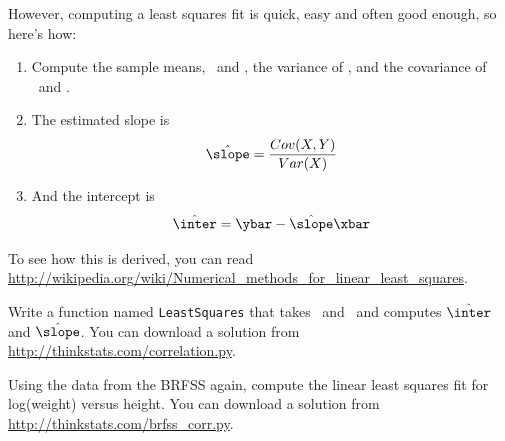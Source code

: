 \documentclass[12pt]{book}
\begin{document}
However, computing a least squares fit is quick, easy and often good
enough, so here's how:

\begin{enumerate}

\item Compute the sample means, \myxbar~and \myybar, the variance
of \X, and the covariance of \X~and \Y.

\item The estimated slope is
%
\[ \hat{\slope} = \frac{Cov(X,Y)}{Var(X)} \]
%
\item And the intercept is
%
\[ \hat{\inter} = \ybar - \hat{\slope} \xbar \]
%
\end{enumerate}

To see how this is derived, you can read
\url{http://wikipedia.org/wiki/Numerical_methods_for_linear_least_squares}.


\begin{exercise}
Write a function named {\tt LeastSquares} that takes \X~and \Y~and
computes $\hat{\inter}$ and $\hat{\slope}$.  You can download a
solution from \url{http://thinkstats.com/correlation.py}.  

\end{exercise}

\begin{exercise}
Using the data from the BRFSS again, compute the linear least squares
fit for log(weight) versus height.  You can download a
solution from \url{http://thinkstats.com/brfss_corr.py}.

\end{exercise}
\end{document}
